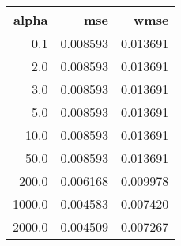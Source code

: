 \begin{tabular}{rrr}
\toprule
 alpha &      mse &     wmse \\
\midrule
   0.1 & 0.008593 & 0.013691 \\
   2.0 & 0.008593 & 0.013691 \\
   3.0 & 0.008593 & 0.013691 \\
   5.0 & 0.008593 & 0.013691 \\
  10.0 & 0.008593 & 0.013691 \\
  50.0 & 0.008593 & 0.013691 \\
 200.0 & 0.006168 & 0.009978 \\
1000.0 & 0.004583 & 0.007420 \\
2000.0 & 0.004509 & 0.007267 \\
\bottomrule
\end{tabular}

